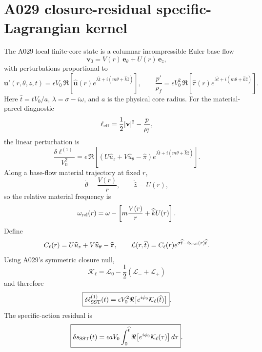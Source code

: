 \section{A029 closure-residual specific-Lagrangian kernel}
The A029 local finite-core state is a columnar incompressible Euler base flow
\[
\mathbf{v}_0=V(r)\,\mathbf e_\theta+U(r)\,\mathbf e_z,
\]
with perturbations proportional to
\[
\mathbf u'(r,\theta,z,t)=\epsilon V_0\,\Re\!\left[\widehat{\mathbf u}(r)
 e^{\lambda \widehat t+i(m\theta+\widehat k\widehat z)}\right],
\qquad
\frac{p'}{\rho_{\!f}}=\epsilon V_0^2\,\Re\!\left[\widehat\pi(r)
 e^{\lambda \widehat t+i(m\theta+\widehat k\widehat z)}\right].
\]
Here \(\widehat t=tV_0/a\), \(\lambda=\sigma-i\omega\), and \(a\) is the physical core radius.
For the material-parcel diagnostic
\[
\ell_{\rm eff}=\frac12|\mathbf v|^2-\frac{p}{\rho_{\!f}},
\]
the linear perturbation is
\[
\frac{\delta\ell^{(1)}}{V_0^2}
=\epsilon\,\Re\!\left[
\left(U\widehat u_z+V\widehat u_\theta-\widehat\pi\right)e^{\lambda\widehat t+i(m\theta+\widehat k\widehat z)}
\right].
\]
Along a base-flow material trajectory at fixed \(r\),
\[
\dot\theta=\frac{V(r)}{r},\qquad \dot{\widehat z}=U(r),
\]
so the relative material frequency is
\[
\omega_{\rm rel}(r)=\omega-\left[m\frac{V(r)}{r}+\widehat k U(r)\right].
\]
Define
\[
C_\ell(r)=U\widehat u_z+V\widehat u_\theta-\widehat\pi,
\qquad
\mathcal L(r,\widehat t)=C_\ell(r)e^{\sigma\widehat t-i\omega_{\rm rel}(r)\widehat t}.
\]
Using A029's symmetric closure null,
\[
\boxed{
\mathcal K_\ell=\mathcal L_{0}-\frac12\left(\mathcal L_{-}+\mathcal L_{+}\right)
}
\]
and therefore
\[
\boxed{
\delta\ell_{\rm SST}^{(1)}(t)
=\epsilon V_0^2\Re\!\left[e^{i\phi_0}\mathcal K_\ell(\widehat t)\right]
}.
\]
The specific-action residual is
\[
\boxed{
\delta s_{\rm SST}(t)=\epsilon aV_0
\int_0^{\widehat t}\Re\!\left[e^{i\phi_0}\mathcal K_\ell(\tau)\right]d\tau
}.
\]
